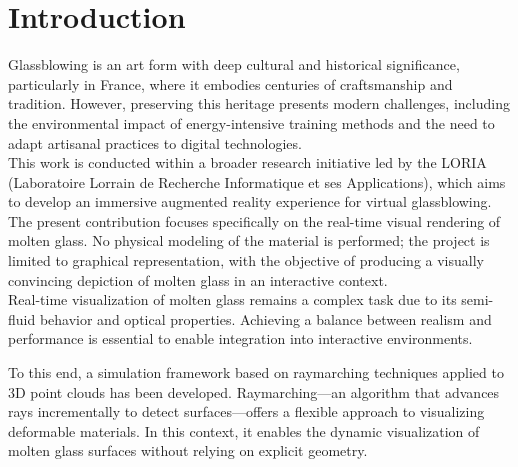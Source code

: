 \documentclass{rapportcs}
\begin{document}

\newpage

\begingroup %
\color{blue}
\renewcommand*\contentsname{Table of contents}
\tabledematieres %
\endgroup




\section{Introduction}

    Glassblowing is an art form with deep cultural and historical significance, particularly in France, where it embodies centuries of craftsmanship and tradition. However, preserving this heritage presents modern challenges, including the environmental impact of energy-intensive training methods and the need to adapt artisanal practices to digital technologies. \\
    
    This work is conducted within a broader research initiative led by the LORIA (Laboratoire Lorrain de Recherche Informatique et ses Applications), which aims to develop an immersive augmented reality experience for virtual glassblowing. The present contribution focuses specifically on the real-time visual rendering of molten glass. No physical modeling of the material is performed; the project is limited to graphical representation, with the objective of producing a visually convincing depiction of molten glass in an interactive context. \\
    
    Real-time visualization of molten glass remains a complex task due to its semi-fluid behavior and optical properties. Achieving a balance between realism and performance is essential to enable integration into interactive environments.
    
    To this end, a simulation framework based on raymarching techniques applied to 3D point clouds has been developed. Raymarching—an algorithm that advances rays incrementally to detect surfaces—offers a flexible approach to visualizing deformable materials. In this context, it enables the dynamic visualization of molten glass surfaces without relying on explicit geometry. \\
    
\end{document}
